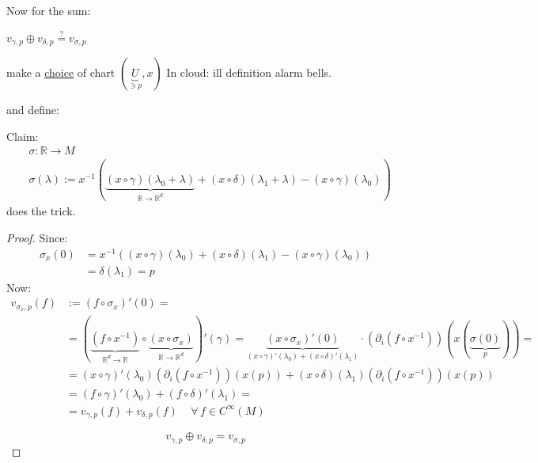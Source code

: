	Now for the sum: 
	
	$v_{\gamma,p} \oplus v_{\delta,p} \overset{?}{=} v_{\sigma, p} $
	
	make a \underline{choice} of chart $(\underbrace{U}_{\ni p} , x)$  In cloud: ill definition alarm bells. 
	
	and define:
	
	Claim:
	\[
	\begin{aligned}
	& \sigma : \mathbb{R} \to M \\
	& \sigma(\lambda) := x^{-1}( \underbrace{ (x\circ \gamma)(\lambda_0 + \lambda)}_{\mathbb{R} \to \mathbb{R}^d}  + (x\circ \delta)(\lambda_1+ \lambda) - (x\circ \gamma)(\lambda_0) )
	\end{aligned}
	\]
	does the trick.
	\begin{proof}
		Since: 
		\[
		\begin{aligned}
		\sigma_x(0) & = x^{-1}((x\circ \gamma)(\lambda_0) + (x\circ \delta)(\lambda_1) - (x\circ \gamma)(\lambda_0)) \\
		& = \delta(\lambda_1) = p \end{aligned}
		\]
		Now:
		\[
		\begin{aligned}
		v_{\sigma_x,p}(f) & := (f\circ \sigma_x)'(0) =  \\ 
		& = ( \underbrace{ (f\circ x^{-1}) }_{\mathbb{R}^d \to \mathbb{R}}  \circ \underbrace{ (x\circ \sigma_x) }_{\mathbb{R} \to \mathbb{R}^d}  )'(\gamma) = \underbrace{ (x\circ \sigma_x)'(0) }_{(x\circ \gamma)'(\lambda_0) + (x\circ \delta)'(\lambda_1) } \cdot \left( \partial_i (f\circ x^{-1}) \right)(x( \underbrace{ \sigma(0)}_{p} ) ) = \\
		& = (x\circ \gamma)'(\lambda_0)(\partial_i (f\circ x^{-1}) )(x(p)) + (x\circ \delta)(\lambda_1)(\partial_i (f\circ x^{-1})  )(x(p)) \\
		& = (f\circ \gamma)'(\lambda_0) + (f\circ \delta)'(\lambda_1) = \\
		& = v_{\gamma,p}(f) + v_{\delta,p}(f) \quad \, \forall \, f \in C^{\infty}(M)
		\end{aligned}
		\]
		
		\[
		\boxed{ v_{\gamma,p} \oplus v_{\delta,p} = v_{\sigma, p} }
		\]
	\end{proof}
	
	
